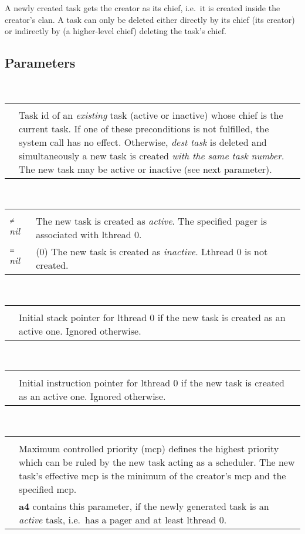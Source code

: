\documentclass[a4paper,11pt,twoside,dvips]{book}
\makeatletter
\newcommand{\smaller}[1]{{\mathchoice 
           {\raisebox{1pt}{$\scriptstyle #1$}} 
           {\raisebox{1pt}{$\scriptstyle #1$}} 
           {\raisebox{0.5pt}{$\scriptscriptstyle #1$}} 
           {\raisebox{0.5pt}{$\scriptscriptstyle #1$}} 
}}
\newcommand{\EQ}{\smaller{=}}
\newcommand{\NE}{\smaller{\neq}}
\newlength{\Up}\setlength{\Up}{-\baselineskip}
\newlength{\Params}
\newenvironment{param}[1] 
{%
\setlength{\Params}{\textwidth}\addtolength{\Params}{-140pt}%
\par\vspace{5pt}%
\noindent\begin{minipage}{\textwidth} 
\noindent {\em #1}\\[\Up]%
\noindent\begin{tabular}{@{\hspace*{75pt}}lp{\Params}}%
\hspace*{30pt}&\\[\Up]%
} 
{%
\end{tabular}\end{minipage}\par\vspace{5pt}%
}
\newcommand{\reg}[1]{\mbox{\textbf{#1}}}
\makeatother
\begin{document}
A newly created task gets the creator as its chief, i.e.\ it is created
inside the creator's clan. \cbstart A task can only be deleted either
directly by its chief (its creator) or indirectly by (a higher-level
chief) deleting the task's chief. \cbend
 
 
\subsection*{Parameters} 
 
 
\begin{param}{dest task} 
                     & Task id of an {\em existing} task (active or
                           inactive) whose chief is the current task. If
                           one of these preconditions is not fulfilled,
                           the system call has no effect. Otherwise,
                           {\em dest task} is deleted and simultaneously
                           a new task is created {\em with the same task
                           number}.  The new task may be active or
                           inactive (see next parameter).
\end{param} 
 
 
\begin{param}{pager} 
         $\NE$ {\em nil} & The new task is created as {\em active}. 
                           The specified pager is associated with lthread 0.\\ 
% 
         $\EQ$ {\em nil} & (0) The new task is created as {\em
                           inactive}. Lthread 0 is not created. \\ 
\end{param} 
 
 
\begin{param}{SP}   &     Initial stack pointer for lthread 0 if the new
                           task is created as an active one. Ignored
                           otherwise. 
% 
\end{param} 
 
\begin{param}{IP}   &     Initial instruction pointer for lthread 0 if the
                           new task is created as an active one. Ignored
                           otherwise. 
% 
\end{param} 
 
 
 
\begin{param}{mcp}   &     Maximum controlled priority (mcp) defines the
                           highest priority which can be ruled by the
                           new task acting as a scheduler. The new task's
                           effective mcp is the minimum of the creator's mcp and the
                           specified mcp.\\ 
                     &     \reg{a4} contains this parameter, if the newly
                           generated task is an {\em active} task, i.e.\ has
                           a pager and at least lthread 0. 
\end{param} 
 
\end{document}
